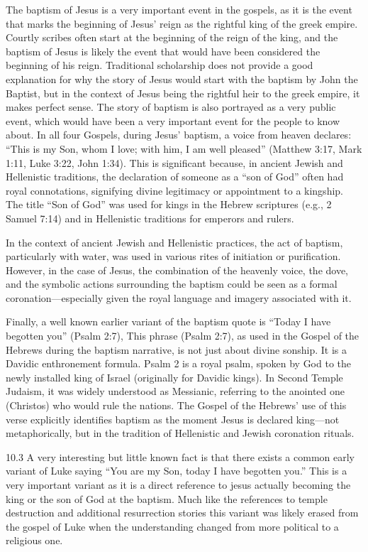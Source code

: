 The baptism of Jesus is a very important event in the gospels, as it is the event that marks the beginning of Jesus' reign as the rightful king of the greek empire.
Courtly scribes often start at the beginning of the reign of the king, and the baptism of Jesus is likely the event that would have been considered the beginning of his reign.
Traditional scholarship does not provide a good explanation for why the story of Jesus would start with the baptism by John the Baptist, but in the context of Jesus being the rightful heir to the greek empire, it makes perfect sense.
The story of baptism is also portrayed as a very public event, which would have been a very important event for the people to know about.
In all four Gospels, during Jesus' baptism, a voice from heaven declares: ``This is my Son, whom I love; with him, I am well pleased'' (Matthew 3:17, Mark 1:11, Luke 3:22, John 1:34).
This is significant because, in ancient Jewish and Hellenistic traditions, the declaration of someone as a ``son of God'' often had royal connotations, signifying divine legitimacy or appointment to a kingship.
The title ``Son of God'' was used for kings in the Hebrew scriptures (e.g., 2 Samuel 7:14) and in Hellenistic traditions for emperors and rulers.

In the context of ancient Jewish and Hellenistic practices, the act of baptism, particularly with water, was used in various rites of initiation or purification.
However, in the case of Jesus, the combination of the heavenly voice, the dove, and the symbolic actions surrounding the baptism could be seen as a formal coronation---especially given the royal language and imagery associated with it.

Finally, a well known earlier variant of the baptism quote is ``Today I have begotten you'' (Psalm 2:7), This phrase (Psalm 2:7), as used in the Gospel of the Hebrews during the baptism narrative, is not just about divine sonship.
It is a Davidic enthronement formula.
Psalm 2 is a royal psalm, spoken by God to the newly installed king of Israel (originally for Davidic kings).
In Second Temple Judaism, it was widely understood as Messianic, referring to the anointed one (Christos) who would rule the nations.
The Gospel of the Hebrews' use of this verse explicitly identifies baptism as the moment Jesus is declared king---not metaphorically, but in the tradition of Hellenistic and Jewish coronation rituals.

10.3 A very interesting but little known fact is that there exists a common early variant of Luke saying ``You are my Son, today I have begotten you.'' This is a very important variant as it is a direct reference to jesus actually becoming the king or the son of God at the baptism.
Much like the references to temple destruction and additional resurrection stories this variant was likely erased from the gospel of Luke when the understanding changed from more political to a religious one.

